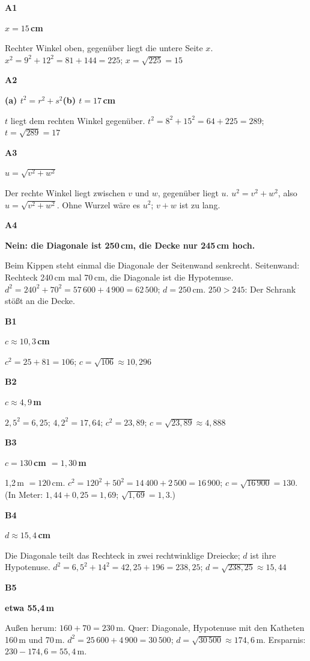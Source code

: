 \documentclass[11pt]{article}
\newcommand{\lsg}[3]{\par\noindent\begin{minipage}[t]{9mm}\textbf{#1}\end{minipage}%
  \begin{minipage}[t]{52mm}\raggedright\bfseries\boldmath #2\end{minipage}\hspace{3mm}%
  \begin{minipage}[t]{\dimexpr\linewidth-64mm\relax}\raggedright\small #3\end{minipage}\par\vspace{4pt}}
\begin{document}
\par\smallskip
{}\par
\par\Needspace{25mm}\vspace{6pt}\noindent\colorbox{black!12}{}\hspace{2mm}{\bfseries Hypotenuse finden und berechnen}\par\vspace{4pt}
\lsg{A1}{$x = 15$\,cm}{Rechter Winkel oben, gegenüber liegt die untere Seite $x$. $x^2 = 9^2 + 12^2 = 81 + 144 = 225$; $x = \sqrt{225} = 15$}
\lsg{A2}{(a) $t^2 = r^2 + s^2$\quad (b) $t = 17$\,cm}{$t$ liegt dem rechten Winkel gegenüber. $t^2 = 8^2 + 15^2 = 64 + 225 = 289$; $t = \sqrt{289} = 17$}
\lsg{A3}{$u = \sqrt{v^2 + w^2}$}{Der rechte Winkel liegt zwischen $v$ und $w$, gegenüber liegt $u$. $u^2 = v^2 + w^2$, also $u = \sqrt{v^2 + w^2}$. Ohne Wurzel wäre es $u^2$; $v + w$ ist zu lang.}
\lsg{A4}{Nein: die Diagonale ist 250\,cm, die Decke nur 245\,cm hoch.}{Beim Kippen steht einmal die Diagonale der Seitenwand senkrecht. Seitenwand: Rechteck 240\,cm mal 70\,cm, die Diagonale ist die Hypotenuse. $d^2 = 240^2 + 70^2 = 57\,600 + 4\,900 = 62\,500$; $d = 250$\,cm. $250 > 245$: Der Schrank stößt an die Decke.}
\par\Needspace{25mm}\vspace{6pt}\noindent\colorbox{black!12}{}\hspace{2mm}{\bfseries Wenn die Wurzel nicht aufgeht}\par\vspace{4pt}
\lsg{B1}{$c \approx 10{,}3$\,cm}{$c^2 = 25 + 81 = 106$; $c = \sqrt{106} \approx 10{,}296$}
\lsg{B2}{$c \approx 4{,}9$\,m}{$2{,}5^2 = 6{,}25$; $4{,}2^2 = 17{,}64$; $c^2 = 23{,}89$; $c = \sqrt{23{,}89} \approx 4{,}888$}
\lsg{B3}{$c = 130$\,cm $= 1{,}30$\,m}{1,2\,m $= 120$\,cm. $c^2 = 120^2 + 50^2 = 14\,400 + 2\,500 = 16\,900$; $c = \sqrt{16\,900} = 130$. (In Meter: $1{,}44 + 0{,}25 = 1{,}69$; $\sqrt{1{,}69} = 1{,}3$.)}
\lsg{B4}{$d \approx 15{,}4$\,cm}{Die Diagonale teilt das Rechteck in zwei rechtwinklige Dreiecke; $d$ ist ihre Hypotenuse. $d^2 = 6{,}5^2 + 14^2 = 42{,}25 + 196 = 238{,}25$; $d = \sqrt{238{,}25} \approx 15{,}44$}
\lsg{B5}{etwa 55,4\,m}{Außen herum: $160 + 70 = 230$\,m. Quer: Diagonale, Hypotenuse mit den Katheten 160\,m und 70\,m. $d^2 = 25\,600 + 4\,900 = 30\,500$; $d = \sqrt{30\,500} \approx 174{,}6$\,m. Ersparnis: $230 - 174{,}6 = 55{,}4$\,m.}
\end{document}
